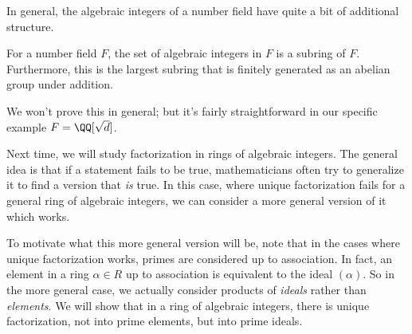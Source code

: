 In general, the algebraic integers of a number field have quite a bit of additional structure. 

\begin{theorem}
For a number field $F$, the set of algebraic integers in $F$ is a subring of $F$. Furthermore, this is the largest subring that is finitely generated as an abelian group under addition. 
\end{theorem}


We won't prove this in general; but it's fairly straightforward in our specific example $F = \QQ[\sqrt{d}]$.

Next time, we will study factorization in rings of algebraic integers. The general idea is that if a statement fails to be true, mathematicians often try to generalize it to find a version that \emph{is} true. In this case, where unique factorization fails for a general ring of algebraic integers, we can consider a more general version of it which works. 

To motivate what this more general version will be, note that in the cases where unique factorization works, primes are considered up to association. In fact, an element in a ring $\alpha \in R$ up to association is equivalent to the ideal $(\alpha)$. So in the more general case, we actually consider products of \emph{ideals} rather than \emph{elements}. We will show that in a ring of algebraic integers, there is unique factorization, not into prime elements, but into prime ideals. 